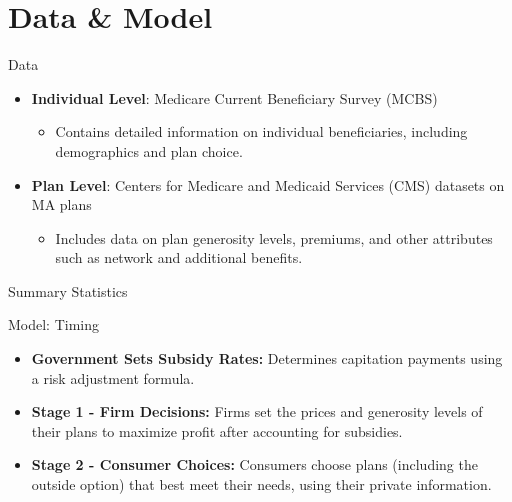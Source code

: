 \documentclass[professionalfonts, aspectratio=169]{beamer}
\begin{document}
\section{Data \& Model}

\begin{frame}{Data}
  \begin{itemize}
    \item \textbf{Individual Level}: Medicare Current Beneficiary Survey (MCBS)
    \begin{itemize}
      \item Contains detailed information on individual beneficiaries, including demographics and plan choice.
    \end{itemize}
    \item \textbf{Plan Level}: Centers for Medicare and Medicaid Services (CMS) datasets on MA plans
    \begin{itemize}
      \item Includes data on plan generosity levels, premiums, and other attributes such as network and additional benefits.
    \end{itemize}
  \end{itemize}
\end{frame}

\begin{frame}{Summary Statistics}
  
\end{frame}
  
\begin{frame}{Model: Timing}
  \begin{itemize}
    \item \textbf{Government Sets Subsidy Rates:} Determines capitation payments using a risk adjustment formula.
    \item \textbf{Stage 1 - Firm Decisions:} Firms set the prices and generosity levels of their plans to maximize profit after accounting for subsidies.
    \item \textbf{Stage 2 - Consumer Choices:} Consumers choose plans (including the outside option) that best meet their needs, using their private information.
  \end{itemize}
\end{frame}
\end{document}
